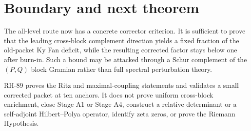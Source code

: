 \documentclass[11pt]{article}
\theoremstyle{remark}
\begin{document}
\section{Boundary and next theorem}

The all-level route now has a concrete corrector criterion.  It is sufficient
to prove that the leading cross-block complement direction yields a fixed
fraction of the old-packet Ky Fan deficit, while the resulting corrected
factor stays below one after burn-in.  Such a bound may be attacked through a
Schur complement of the $(P,Q)$ block Gramian rather than full spectral
perturbation theory.

RH-89 proves the Ritz and maximal-coupling statements and validates a small
corrected packet at ten anchors.  It does not prove uniform cross-block
enrichment, close Stage A1 or Stage A4, construct a relative determinant or a
self-adjoint Hilbert--Polya operator, identify zeta zeros, or prove the
Riemann Hypothesis.



\end{document}
